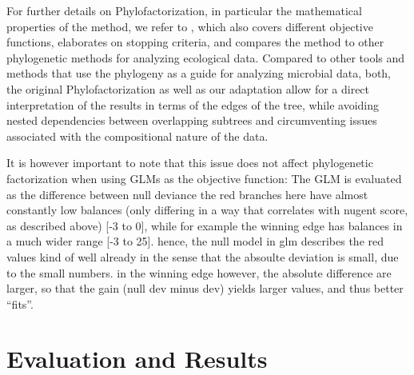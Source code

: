 For further details on Phylofactorization, in particular the mathematical properties of the method,
we refer to \cite{Washburne2019},
which also covers different objective functions, elaborates on stopping criteria,
and compares the method to other phylogenetic methods for analyzing ecological data.
Compared to other tools and methods that use the phylogeny as a guide for analyzing microbial data,
both, the original Phylofactorization as well as our adaptation allow for a direct interpretation of the results
in terms of the edges of the tree, while avoiding nested dependencies between overlapping subtrees
and circumventing issues associated with the compositional nature of the data.



It is however important to note that this issue does not affect phylogenetic factorization
when using \acp{GLM} as the objective function:
The \ac{GLM} is evaluated as the difference between null deviance
the red branches here have almost constantly low balances (only differing in a way that correlates with nugent score,
as described above) [-3 to 0], while for example the winning edge has balances in a much wider range [-3 to 25].
hence, the null model in glm describes the red values kind of well already
in the sense that the absoulte deviation is small, due to the small numbers.
in the winning edge however, the absolute difference are larger, so that the gain (null dev minus dev) yields
larger values, and thus better ``fits''.



\section{Evaluation and Results}
\label{ch:Factorization:sec:Evaluation}



